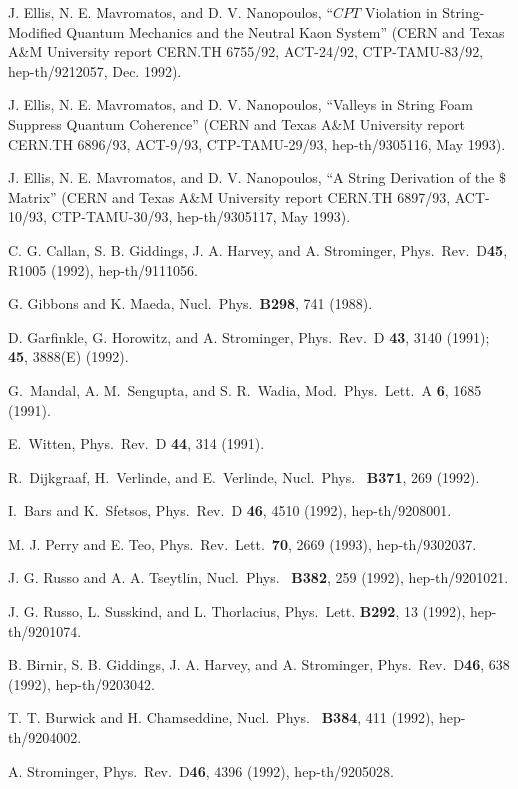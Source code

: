 \documentclass[12pt]{article}
\begin{document}
\begin{thebibliography}{999}
 J. Ellis, N. E. Mavromatos, and D. V. Nanopoulos,
``$CPT$ Violation in String-Modified
Quantum Mechanics and the Neutral Kaon System''
(CERN and Texas A\&M University report CERN.TH 6755/92, ACT-24/92,
CTP-TAMU-83/92, hep-th/9212057, Dec. 1992).

 J. Ellis, N. E. Mavromatos, and D. V. Nanopoulos,
``Valleys in String Foam Suppress Quantum Coherence''
(CERN and Texas A\&M University report CERN.TH 6896/93, ACT-9/93,
CTP-TAMU-29/93, hep-th/9305116, May 1993).

 J. Ellis, N. E. Mavromatos, and D. V. Nanopoulos,
``A String Derivation of the $\$$ Matrix''
(CERN and Texas A\&M University report CERN.TH 6897/93, ACT-10/93,
CTP-TAMU-30/93, hep-th/9305117, May 1993).

 C. G. Callan, S. B. Giddings, J. A. Harvey, and A.
Strominger,
Phys.\ Rev.\ D{\bf 45}, R1005 (1992), hep-th/9111056.

 G. Gibbons and K. Maeda, Nucl.\ Phys.\ {\bf B298},
741 (1988).

 D. Garfinkle, G. Horowitz, and A. Strominger, Phys.\
Rev.\ D{\bf
43}, 3140 (1991); {\bf 45}, 3888(E) (1992).

 G.~Mandal, A. M.~Sengupta, and S. R.~Wadia,
Mod.~Phys.~Lett.~A
{\bf 6}, 1685 (1991).

 E.~Witten, Phys.~Rev.~D {\bf  44}, 314 (1991).

 R.~Dijkgraaf, H.~Verlinde, and E.~Verlinde,
Nucl.~Phys.~{\bf
B371}, 269 (1992).

 I.~Bars and K.~Sfetsos, Phys.~Rev.~D {\bf  46}, 4510
(1992),
hep-th/9208001.

 M. J. Perry and E. Teo, Phys.\ Rev.\ Lett.\ {\bf 70},
2669
(1993),
hep-th/9302037.

 J. G. Russo and A. A. Tseytlin, Nucl.\ Phys.\ {\bf
B382},
259 (1992), hep-th/9201021.

 J. G. Russo, L. Susskind, and L. Thorlacius, Phys.\
Lett. {\bf
B292}, 13 (1992), hep-th/9201074.

 B. Birnir, S. B. Giddings, J. A. Harvey, and A.
Strominger,
Phys.\ Rev.\ D{\bf 46}, 638 (1992), hep-th/9203042.

 T. T. Burwick and H. Chamseddine, Nucl.\ Phys.\ {\bf
B384},
411 (1992), hep-th/9204002.

 A. Strominger, Phys.\ Rev.\ D{\bf 46}, 4396 (1992),
hep-th/9205028.


\end{thebibliography}
\end{document}
